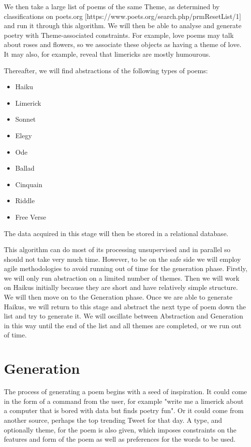 We then take a large list of poems of the same Theme, as determined by classifications on poets.org [https://www.poets.org/search.php/prmResetList/1] and run it through this algorithm. We will then be able to analyse and generate poetry with Theme-associated constraints. For example, love poems may talk about roses and flowers, so we associate these objects as having a theme of love. It may also, for example, reveal that limericks are mostly humourous.

Thereafter, we will find abstractions of the following types of poems:
\begin{itemize}
\setlength{\itemsep}{0pt}
\item{Haiku}
\item{Limerick}
\item{Sonnet}
\item{Elegy}
\item{Ode}
\item{Ballad}
\item{Cinquain}
\item{Riddle}
\item{Free Verse}
\end{itemize}

The data acquired in this stage will then be stored in a relational database.

This algorithm can do most of its processing unsupervised and in parallel so should not take very much time. However, to be on the safe side we will employ agile methodologies to avoid running out of time for the generation phase. Firstly, we will only run abstraction on a limited number of themes. Then we will work on Haikus initially because they are short and have relatively simple structure. We will then move on to the Generation phase. Once we are able to generate Haikus, we will return to this stage and abstract the next type of poem down the list and try to generate it. We will oscillate between Abstraction and Generation in this way until the end of the list and all themes are completed, or we run out of time.

\section{Generation}

The process of generating a poem begins with a seed of inspiration. It could come in the form of a command from the user, for example "write me a limerick about a computer that is bored with data but finds poetry fun". Or it could come from another source, perhaps the top trending Tweet for that day. A type, and optionally theme, for the poem is also given, which imposes constraints on the features and form of the poem as well as preferences for the words to be used.

